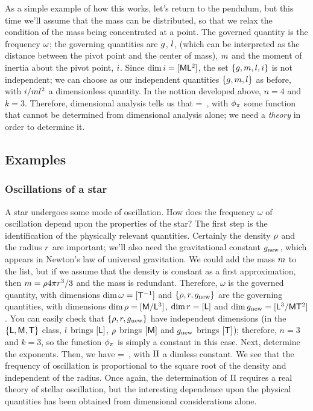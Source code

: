As a simple example of how this works, let's return to the pendulum, but this time we'll assume that the mass can be distributed, so that we relax the condition of the mass being concentrated at a point. The governed quantity is the frequency $\omega$; the governing quantities are $g$, $l$, (which can be interpreted as the distance between the pivot point and the center of mass), $m$ and the moment of inertia about the pivot point, $i$. Since $\dim i = [\mathsf{M}\mathsf{L}^2]$, the set $\left\lbrace{g, m, l, i}\right\rbrace$ is not independent; we can choose as our independent quantities $\left\lbrace{g, m, l}\right\rbrace$ as before, with $i/ml^2$ a dimensionless quantity. In the nottion developed above, $n = 4$ and $k = 3$. Therefore, dimensional analysis tells us that
\beq
\angfreq = \sqrt{\dfrac{\grav}{\length}}\kdimf{}\,,
\eeq
with $\phi_{\pi}$ some function that cannot be determined from dimensional analysis alone; we need a \emph{theory} in order to determine it.


\subsection{Examples}

\subsubsection{Oscillations of a star}
A star undergoes some mode of oscillation. How does the frequency $\omega$ of oscillation depend upon the properties of the star? The first step is the identification of the physically relevant quantities. Certainly the density $\rho$ and the radius $r$ are important; we'll also need the gravitational constant $g_\text{new}$, which appears in Newton's law of universal gravitation. We could add the mass $m$ to the list, but if we assume that the density is constant as a first approximation, then $m = \rho 4\pi r^3/3$ and the mass is redundant. Therefore, $\omega$ is the governed quantity, with dimensions $\dim\omega = [\mathsf{T}^{-1}]$ and $\left\lbrace{\rho, r, g_\text{new}}\right\rbrace$ are the governing quantities, with dimensions $\dim\rho = [\mathsf{M}/\mathsf{L}^3]$, $\dim r = [\mathsf{L}]$ and $\dim g_\text{new} = [\mathsf{L}^3/\mathsf{M}\mathsf{T}^{2}]$. You can easily check that $\left\lbrace{\rho, r, g_\text{new}}\right\rbrace$ have independent dimensions (in the $\left\lbrace{\mathsf{L}, \mathsf{M}, \mathsf{T}}\right\rbrace$ class, $l$ brings $[\mathsf{L}]$, $\rho$ brings $[\mathsf{M}]$ and $g_\text{new}$ brings $[\mathsf{T}]$); therefore, $n = 3$ and $k = 3$, so the function $\phi_{\pi}$ is simply a constant in this case. Next, determine the exponents. Then, we have
\beq
\omega = \kdim\sqrt{\kgrav\dens}\,,
\eeq
with $\Pi$ a dimless constant. We see that the frequency of oscillation is proportional to the square root of the density and independent of the radius. Once again, the determination of $\Pi$ requires a real theory of stellar oscillation, but the interesting dependence upon the physical quantities has been obtained from dimensional considerations alone.


